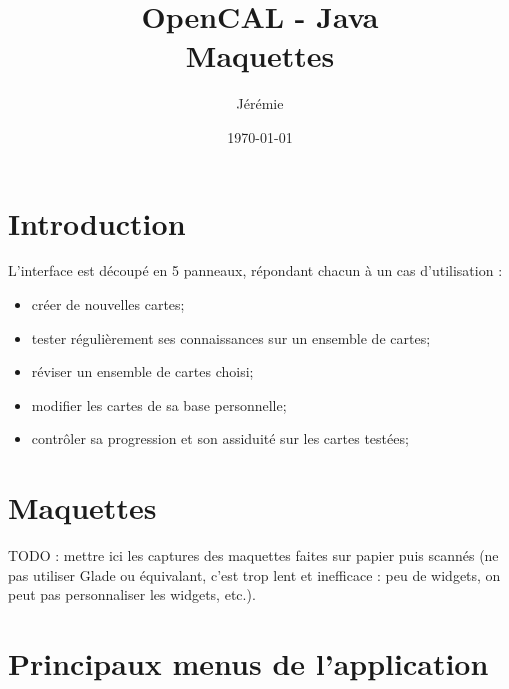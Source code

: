 \documentclass[pdftex,a4paper,11pt]{article}
\begin{document}
\title{OpenCAL - Java\\\medskip
       Maquettes}
\author{Jérémie }
\date{\today}

\maketitle


\section{Introduction}

L'interface est découpé en 5 panneaux, répondant chacun à un cas d'utilisation :
\begin{itemize}
    \item créer de nouvelles cartes;
    \item tester régulièrement ses connaissances sur un ensemble de cartes;
    \item réviser un ensemble de cartes choisi;
    \item modifier les cartes de sa base personnelle;
    \item contrôler sa progression et son assiduité sur les cartes testées;
\end{itemize}

\section{Maquettes}

TODO : mettre ici les captures des maquettes faites sur papier puis scannés (ne pas utiliser Glade ou équivalant, c'est trop lent et inefficace : peu de widgets, on peut pas personnaliser les widgets, etc.).


\section{Principaux menus de l'application}
\end{document}
